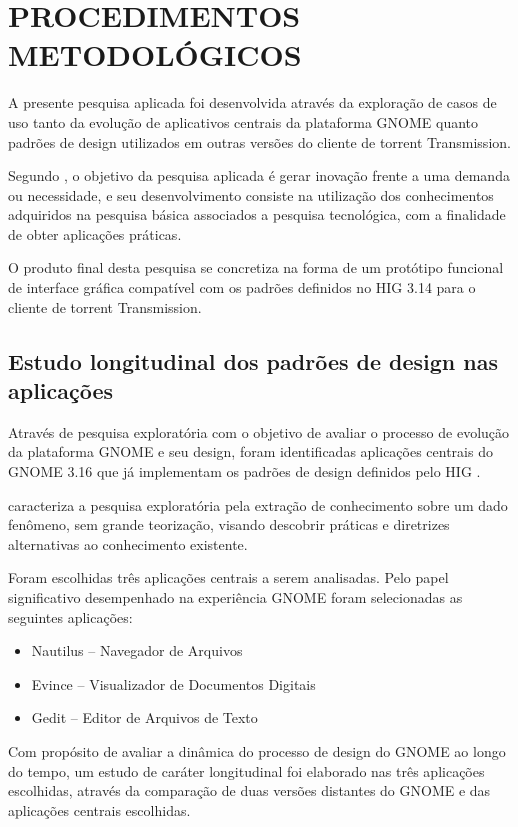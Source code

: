 \chapter{PROCEDIMENTOS METODOLÓGICOS}

A presente pesquisa aplicada foi desenvolvida através da exploração de casos de
uso tanto da evolução de aplicativos centrais da plataforma GNOME quanto padrões
de design utilizados em outras versões do cliente de torrent Transmission.

Segundo , o objetivo da pesquisa aplicada é
gerar inovação frente a uma demanda ou necessidade, e seu desenvolvimento
consiste na utilização dos conhecimentos adquiridos na pesquisa básica
associados a pesquisa tecnológica, com a finalidade de obter aplicações
práticas.

O produto final desta pesquisa se concretiza na forma de um protótipo funcional
de interface gráfica compatível com os padrões definidos no HIG 3.14 para o
cliente de torrent Transmission.

\section{Estudo longitudinal dos padrões de design nas aplicações}
\label{sec:chronologic-analysis}

Através de pesquisa exploratória com o objetivo de avaliar o processo de
evolução da plataforma GNOME e seu design, foram identificadas aplicações
centrais do GNOME 3.16 que já implementam os padrões de design definidos pelo
HIG \cite{gnome314hig}.

 caracteriza a pesquisa exploratória pela
extração de conhecimento sobre um dado fenômeno, sem grande teorização, visando
descobrir práticas e diretrizes alternativas ao conhecimento existente.

Foram escolhidas três aplicações centrais a serem analisadas. Pelo papel
significativo desempenhado na experiência GNOME foram selecionadas as seguintes
aplicações:

\begin{itemize}
    \item Nautilus -- Navegador de Arquivos
    \item Evince -- Visualizador de Documentos Digitais
    \item Gedit -- Editor de Arquivos de Texto
\end{itemize}

Com propósito de avaliar a dinâmica do processo de design do GNOME ao longo do
tempo, um estudo de caráter longitudinal foi elaborado nas três aplicações
escolhidas, através da comparação de duas versões distantes do GNOME e das
aplicações centrais escolhidas.

